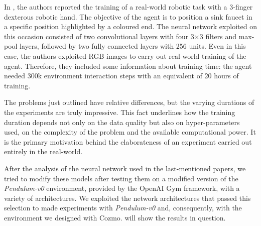 In \cite{haarnoja2018alg}, the authors reported the training of a real-world robotic task with a 3-finger dexterous robotic hand.
The objective of the agent is to position a sink faucet in a specific position highlighted by a coloured end.
The neural network exploited on this occasion consisted of two convolutional layers with four 3$\times$3 filters and max-pool layers, followed by two fully connected layers with 256 units.
Even in this case, the authors exploited RGB images to carry out real-world training of the agent.
Therefore, they included some information about training time: the agent needed 300k environment interaction steps with an equivalent of 20 hours of training.

The problems just outlined have relative differences, but the varying durations of the experiments are truly impressive.
This fact underlines how the training duration depends not only on the data quality but also on hyper-parameters used, on the complexity of the problem and the available computational power.
It is the primary motivation behind the elaborateness of an experiment carried out entirely in the real-world.

After the analysis of the neural network used in the last-mentioned papers, we tried to modify these models after testing them on a modified version of the \textit{Pendulum-v0} environment, provided by the OpenAI Gym framework, with a variety of architectures.
We exploited the network architectures that passed this selection to made experiments with \textit{Pendulum-v0} and, consequently, with the environment we designed with Cozmo.
 will show the results in question.

